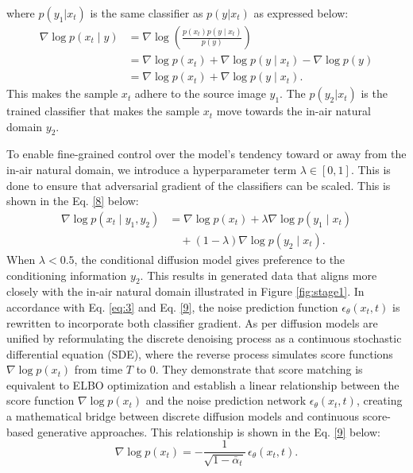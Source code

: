 \documentclass[3p,12pt,authoryear]{elsarticle}
\begin{document}
where $p(y_1|x_t)$ is the same classifier as $p(y|x_t)$ as expressed below: 
\begin{equation}
\label{7}
\begin{aligned}
\nabla \log p(x_t \mid y) &= \nabla \log \left( \frac{p(x_t) p(y \mid x_t)}{p(y)} \right) \\
&= \nabla \log p(x_t) + \nabla \log p(y \mid x_t) - \nabla \log p(y) \\
&= \nabla \log p(x_t) + \nabla \log p(y \mid x_t).
\end{aligned}
\end{equation}
This makes the sample $x_t$ adhere to the source image $y_1$. The $p(y_2|x_t)$ is the trained classifier that makes the sample $x_t$ move towards the in-air natural domain $y_2$.

To enable fine-grained control over the model's tendency toward or away from the in-air natural domain, we introduce a hyperparameter term $\lambda \in [0, 1]$. This is done to ensure that adversarial gradient of the classifiers can be scaled. This is shown in the Eq. \ref{8} below:
\begin{align}
\nabla \log p(x_t \mid y_1, y_2) &= \nabla \log p(x_t) 
+ \lambda \nabla \log p(y_1 \mid x_t) \nonumber \\
&\quad + (1 - \lambda) \nabla \log p(y_2 \mid x_t).
\label{8}
\end{align}
When $\lambda < 0.5$, the conditional diffusion model gives preference to the conditioning information $y_2$. This results in generated data that aligns more closely with the in-air natural domain illustrated in Figure \ref{fig:stage1}. In accordance with Eq. \ref{eq:3} and Eq. \ref{9}, the noise prediction function  $\epsilon_\theta(x_t, t)$ is rewritten to incorporate both classifier gradient. As per \cite{song2020score, 10.5555/3454287.3455354} diffusion models are unified by reformulating the discrete denoising process as a continuous stochastic differential equation (SDE), where the reverse process simulates score functions $\nabla \log p(x_t)$ from time $T$ to $0$. They demonstrate that score matching is equivalent to ELBO optimization and establish a linear relationship between the score function $\nabla \log p(x_t)$ and the noise prediction network $\epsilon_\theta(x_t, t)$, creating a mathematical bridge between discrete diffusion models and continuous score-based generative approaches. This relationship is shown in the Eq. \ref{9} below:
\begin{equation}
\label{9}
\nabla \log p(x_t) = -\frac{1}{\sqrt{1 - \bar{\alpha}_t}} \, \epsilon_\theta(x_t, t).
\end{equation}
\end{document}
